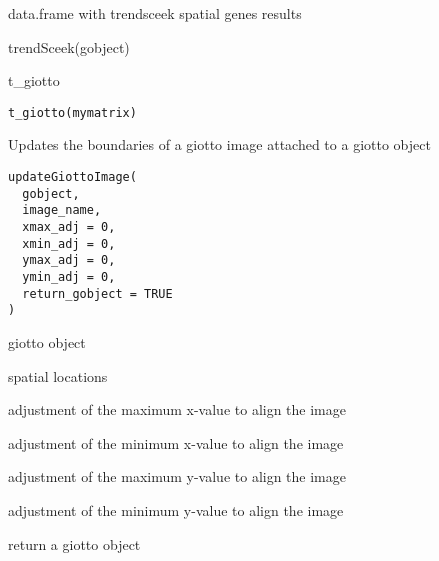 \documentclass[a4paper]{book}
\begin{document}
%
\begin{Value}
data.frame with trendsceek spatial genes results
\end{Value}
%
\begin{Examples}
\begin{ExampleCode}
    trendSceek(gobject)
\end{ExampleCode}
\end{Examples}
%
\begin{Description}\relax
t\_giotto
\end{Description}
%
\begin{Usage}
\begin{verbatim}
t_giotto(mymatrix)
\end{verbatim}
\end{Usage}
%
\begin{Description}\relax
Updates the boundaries of a giotto image attached to a giotto object
\end{Description}
%
\begin{Usage}
\begin{verbatim}
updateGiottoImage(
  gobject,
  image_name,
  xmax_adj = 0,
  xmin_adj = 0,
  ymax_adj = 0,
  ymin_adj = 0,
  return_gobject = TRUE
)
\end{verbatim}
\end{Usage}
%
\begin{Arguments}
\begin{ldescription}
\item[\code{gobject}] giotto object

\item[\code{image\_name}] spatial locations

\item[\code{xmax\_adj}] adjustment of the maximum x-value to align the image

\item[\code{xmin\_adj}] adjustment of the minimum x-value to align the image

\item[\code{ymax\_adj}] adjustment of the maximum y-value to align the image

\item[\code{ymin\_adj}] adjustment of the minimum y-value to align the image

\item[\code{return\_gobject}] return a giotto object
\end{ldescription}
\end{Arguments}
\end{document}
